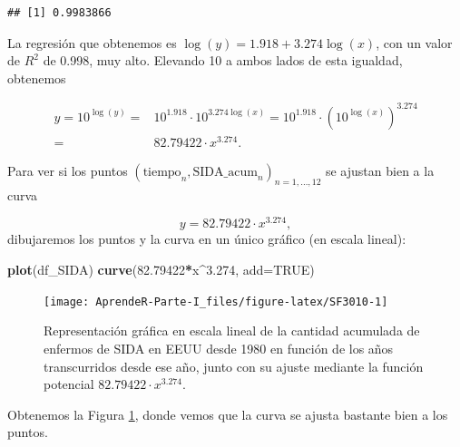 \documentclass[]{book}
\newenvironment{Shaded}{\begin{snugshade}}{\end{snugshade}}
\newcommand{\DataTypeTok}[1]{\textcolor[rgb]{0.13,0.29,0.53}{#1}}
\newcommand{\FloatTok}[1]{\textcolor[rgb]{0.00,0.00,0.81}{#1}}
\newcommand{\KeywordTok}[1]{\textcolor[rgb]{0.13,0.29,0.53}{\textbf{#1}}}
\newcommand{\NormalTok}[1]{#1}
\newcommand{\OperatorTok}[1]{\textcolor[rgb]{0.81,0.36,0.00}{\textbf{#1}}}
\newcommand{\OtherTok}[1]{\textcolor[rgb]{0.56,0.35,0.01}{#1}}
\theoremstyle{definition}
\theoremstyle{definition}
\theoremstyle{definition}
\theoremstyle{remark}
\begin{document}
\begin{Shaded}
\end{Shaded}

\begin{verbatim}
## [1] 0.9983866
\end{verbatim}

La regresión que obtenemos es \(\log(y)=1.918 + 3.274\log(x)\), con un valor de \(R^2\) de 0.998, muy alto.
Elevando 10 a ambos lados de esta igualdad, obtenemos

\begin{align*}
y=10^{\log(y)}= & 10^{1.918}\cdot 10^{3.274\log(x)}=10^{1.918}\cdot (10^{\log(x)})^{3.274}
\\ = & 82.79422\cdot x^{3.274}.
\end{align*}

Para ver si los puntos \((\textrm{tiempo}_n,{\textrm{SIDA_acum}}_n)_{n=1,\ldots,12}\) se ajustan bien a la curva

\[
y=82.79422\cdot x^{3.274},
\]
dibujaremos los puntos y la curva en un único gráfico (en escala lineal):

\begin{Shaded}
\begin{Highlighting}[]
\KeywordTok{plot}\NormalTok{(df_SIDA)}
\KeywordTok{curve}\NormalTok{(}\FloatTok{82.79422}\OperatorTok{*}\NormalTok{x}\OperatorTok{^}\FloatTok{3.274}\NormalTok{, }\DataTypeTok{add=}\OtherTok{TRUE}\NormalTok{)}
\end{Highlighting}
\end{Shaded}

\begin{figure}

{\centering \texttt{[image: AprendeR-Parte-I\_files/figure-latex/SF3010-1]} 

}

\caption{Representación gráfica en escala lineal de la cantidad acumulada de enfermos de SIDA en EEUU desde 1980 en función de los años transcurridos desde ese año, junto con su ajuste mediante la función potencial $82.79422 · x^{3.274}$.}\label{fig:SF3010}
\end{figure}

Obtenemos la Figura
\ref{fig:SF3010}, donde vemos que la curva se ajusta bastante bien a los puntos.
\end{document}

